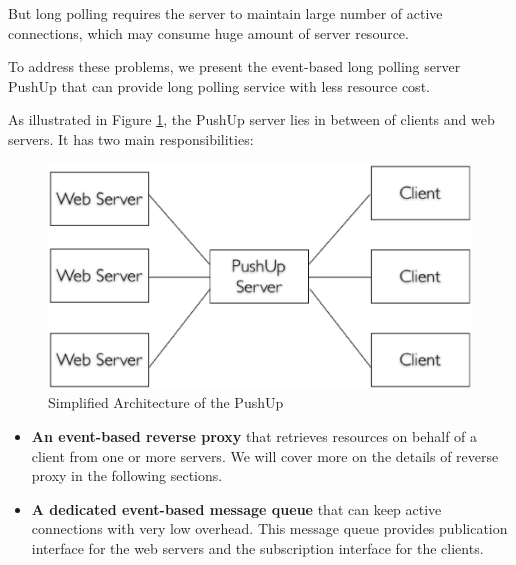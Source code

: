But long polling requires the server to maintain large number of active 
connections, which may consume huge amount of server resource.

To address these problems, we present the event-based\cite{UnixBook}  long polling 
server PushUp that can provide long polling service with less resource cost.

As illustrated in Figure \ref{fig:sim_pushup}, the PushUp server lies in 
between of clients and web servers. It has two main responsibilities:
\begin{figure}[htb!]
\centering
    \includegraphics[scale=0.40]{figures/sim_pushup.eps}
    \caption{Simplified Architecture of the PushUp}
    \label{fig:sim_pushup}
\end{figure}

\begin {itemize}
\item {\bf An event-based reverse proxy}\cite{ReverseProxy} that retrieves 
resources on behalf of a client from one or more servers. We will cover
more on the details of reverse proxy in the following sections.
\item {\bf A dedicated event-based message queue}\cite{PubSub} that can keep active 
connections with very low overhead. This message queue provides publication
interface for the web servers and the subscription interface for the clients.
\end {itemize}

